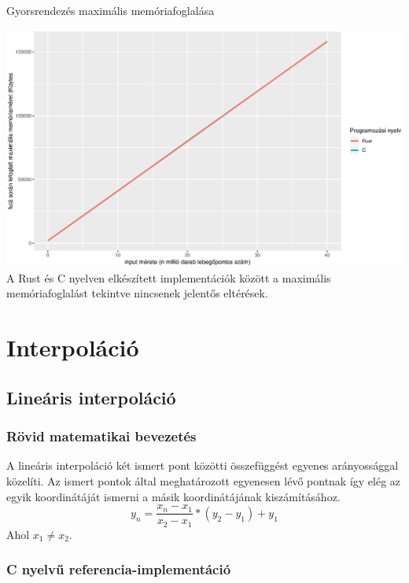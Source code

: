 Gyorsrendezés maximális memóriafoglalása

\includegraphics[width=15.5cm]{kepek/quick_memory.eps}
A Rust és C nyelven elkészített implementációk között a maximális memóriafoglalást tekintve nincsenek jelentős eltérések.

\section{Interpoláció}

\subsection{Lineáris interpoláció}
\subsubsection{Rövid matematikai bevezetés}
A lineáris interpoláció két ismert pont közötti összefüggést egyenes arányossággal közelíti. Az ismert pontok által meghatározott egyenesen lévő pontnak így elég az egyik koordinátáját ismerni a másik koordinátájának kiszámításához.
\[ y_n = \frac{x_n - x_1}{x_2 - x_1} * (y_2 - y_1) + y_1 \]
Ahol $x_1 \neq x_2$.
\subsubsection{C nyelvű referencia-implementáció}
